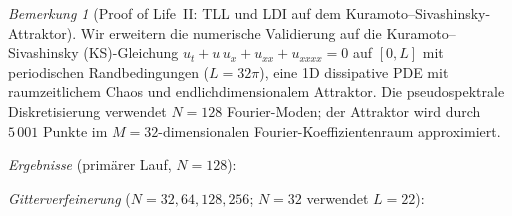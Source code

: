 \documentclass[12pt,a4paper]{article}
\theoremstyle{definition}
\theoremstyle{plain}
\theoremstyle{remark}
\newtheorem{remark}[definition]{Bemerkung}
\begin{document}
\begin{remark}[Proof of Life~II: TLL und LDI auf dem Kuramoto--Sivashinsky-Attraktor]
\label{rem:tll-ldi-ks}
Wir erweitern die numerische Validierung auf die Kuramoto--Sivashinsky (KS)-Gleichung
$u_t + u\,u_x + u_{xx} + u_{xxxx} = 0$ auf $[0, L]$ mit periodischen Randbedingungen
($L = 32\pi$), eine 1D dissipative PDE mit raumzeitlichem Chaos und
endlichdimensionalem Attraktor. Die pseudospektrale Diskretisierung verwendet $N = 128$
Fourier-Moden; der Attraktor wird durch $5\,001$ Punkte im
$M = 32$-dimensionalen Fourier-Koeffizientenraum approximiert.

\emph{Ergebnisse} (primärer Lauf, $N = 128$):

\begin{center}
\small
{}
\end{center}

\emph{Gitterverfeinerung} ($N = 32, 64, 128, 256$; $N=32$ verwendet $L = 22$):

\begin{center}
\small
{}
\end{center}


\end{remark}
\end{document}
